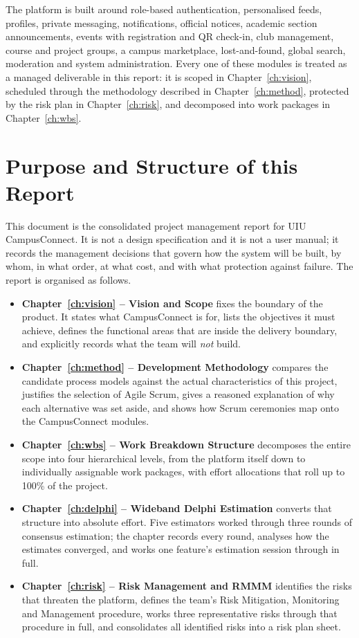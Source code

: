 \documentclass[11pt,a4paper]{report}
\begin{document}
The platform is built around role-based authentication, personalised feeds,
profiles, private messaging, notifications, official notices, academic section
announcements, events with registration and QR check-in, club management, course
and project groups, a campus marketplace, lost-and-found, global search,
moderation and system administration. Every one of these modules is treated as a
managed deliverable in this report: it is scoped in Chapter~\ref{ch:vision},
scheduled through the methodology described in Chapter~\ref{ch:method}, protected
by the risk plan in Chapter~\ref{ch:risk}, and decomposed into work packages in
Chapter~\ref{ch:wbs}.

\section{Purpose and Structure of this Report}

This document is the consolidated project management report for UIU
CampusConnect. It is not a design specification and it is not a user manual; it
records the management decisions that govern how the system will be built, by
whom, in what order, at what cost, and with what protection against failure. The
report is organised as follows.

\begin{itemize}
  \item \textbf{Chapter~\ref{ch:vision} -- Vision and Scope} fixes the boundary
  of the product. It states what CampusConnect is for, lists the objectives it
  must achieve, defines the functional areas that are inside the delivery
  boundary, and explicitly records what the team will \emph{not} build.
  \item \textbf{Chapter~\ref{ch:method} -- Development Methodology} compares the
  candidate process models against the actual characteristics of this project,
  justifies the selection of Agile Scrum, gives a reasoned explanation of why
  each alternative was set aside, and shows how Scrum ceremonies map onto the
  CampusConnect modules.
  \item \textbf{Chapter~\ref{ch:wbs} -- Work Breakdown Structure} decomposes the
  entire scope into four hierarchical levels, from the platform itself down to
  individually assignable work packages, with effort allocations that roll up to
  100\% of the project.
  \item \textbf{Chapter~\ref{ch:delphi} -- Wideband Delphi Estimation} converts
  that structure into absolute effort. Five estimators worked through three
  rounds of consensus estimation; the chapter records every round, analyses how
  the estimates converged, and works one feature's estimation session through in
  full.
  \item \textbf{Chapter~\ref{ch:risk} -- Risk Management and RMMM} identifies
  the risks that threaten the platform, defines the team's Risk Mitigation,
  Monitoring and Management procedure, works three representative risks through
  that procedure in full, and consolidates all identified risks into a risk plan
  sheet.
\end{itemize}
\end{document}
